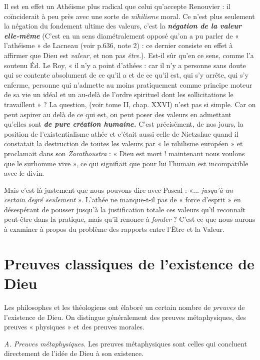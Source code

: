 Il est en effet un Athéisme plus radical que celui qu’accepte
Renouvier : il coïnciderait à peu près avec une sorte de {\it nihilisme}
moral. Ce n’est plus seulement la négation du fondement ultime
des valeurs, c’est la \textbf{\textit {négation de la valeur elle-même}}
{\footnotesize (C'est en un sens diamétralement opposé qu'on a pu parler de « l’athéisme » de
Lacneau (voir p.636, note 2) : ce dernier consiste en effet à affirmer que Dieu est {\it valeur},
et non pas {\it être}.)}.
Est-il sûr
qu’en ce sens, comme l’a soutenu Éd. Le Roy, « il n’y a point
d’athées : car il n’y a personne sans doute qui se contente absolument
de ce qu'il a et de ce qu’il est, qui s’y arrête, qui s’y enferme, personne
qui n’admette au moins pratiquement comme principe moteur de sa
vie un idéal et un au-delà de l’ordre spirituel dont les sollicitations le
travaillent » ? La question, (voir tome II, chap. XXVI) n’est pas si
simple. Car on peut aspirer au delà de ce qui est, on peut poser des
valeurs en admettant qu’elles sont \textbf{\textit {de pure création humaine.}}
C’est précisément, de nos jours, la position de l’existentialisme athée
et c'était aussi celle de Nietzshue quand il constatait la destruction
de toutes les valeurs par « le nihilisme européen » et proclamait dans
son {\it Zarathoustra} : « Dieu est mort ! maintenant nous voulons que le
surhomme vive », ce qui signifiait que pour lui l’humain est incompatible
avec le divin.

Mais c’est là justement que nous pouvons dire avec Pascal : «... {\it jusqu’à
un certain degré seulement} ». L’athée ne manque-t-il pas de « force
d'esprit » en désespérant de pousser jusqu’à la justification totale
ces valeurs qu’il reconnaît peut-être dans la pratique, mais qu’il
renonce à {\it fonder} ? C’est ce que nous aurons à examiner à propos
du problème des rapports entre l’Être et la Valeur.

\section{Preuves classiques de l’existence de Dieu}%
Les philosophes
et les théologiens ont élaboré un certain nombre de {\it preuves} de
l’existence de Dieu. On distingue généralement des preuves métaphysiques,
des preuves « physiques » et des preuves morales.

{\it A. Preuves métaphysiques.} Les preuves métaphysiques sont celles
qui concluent directement de l’idée de Dieu à son existence.

